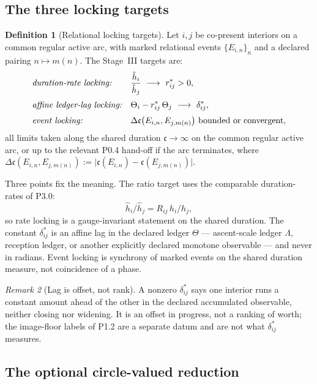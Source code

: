 \documentclass[11pt,a4paper]{article}
\theoremstyle{definition}
\newtheorem{definition}{Definition}[section]
\theoremstyle{plain}
\theoremstyle{remark}
\newtheorem{remark}[definition]{Remark}
\begin{document}
\subsection{The three locking targets}

\begin{definition}[Relational locking targets]\label{def:locking}
Let \(i,j\) be co-present interiors on a common regular active arc, with marked
relational events \(\{E_{i,n}\}_n\) and a declared pairing \(n\mapsto m(n)\). The
Stage~III targets are:
\begin{align*}
&\text{\emph{duration-rate locking:}}
&&\frac{\hat h_i}{\hat h_j}\ \longrightarrow\ r^*_{ij}>0,\\[2pt]
&\text{\emph{affine ledger-lag locking:}}
&&\Theta_i-r^*_{ij}\,\Theta_j\ \longrightarrow\ \delta^*_{ij},\\[2pt]
&\text{\emph{event locking:}}
&&\Delta\mathfrak c\bigl(E_{i,n},E_{j,m(n)}\bigr)
\ \text{bounded or convergent,}
\end{align*}
all limits taken along the shared duration \(\mathfrak c\to\infty\) on the common
regular active arc, or up to the relevant P0.4 hand-off if the arc terminates,
where \(\Delta\mathfrak c(E_{i,n},E_{j,m(n)}):=\bigl|\mathfrak c(E_{i,n})-\mathfrak c(E_{j,m(n)})\bigr|\).
\end{definition}

Three points fix the meaning. The ratio target uses the comparable duration-rates
of P3.0:
\[
\hat h_i/\hat h_j=R_{ij}\,h_i/h_j,
\]
so rate locking is a gauge-invariant statement on the shared duration. The
constant \(\delta^*_{ij}\) is an affine lag in the declared ledger \(\Theta\) ---
ascent-scale ledger \(\Lambda\), reception ledger, or another explicitly declared
monotone observable --- and never in radians. Event locking is synchrony of marked
events on the shared duration measure, not coincidence of a phase.

\begin{remark}[Lag is offset, not rank]\label{rem:lagnotrank}
A nonzero \(\delta^*_{ij}\) says one interior runs a constant amount ahead of the other in
the declared accumulated observable, neither closing nor widening. It is an offset in
progress, not a ranking of worth; the image-floor labels of P1.2 are a separate datum and
are not what \(\delta^*_{ij}\) measures.
\end{remark}

\subsection{The optional circle-valued reduction}
\end{document}
